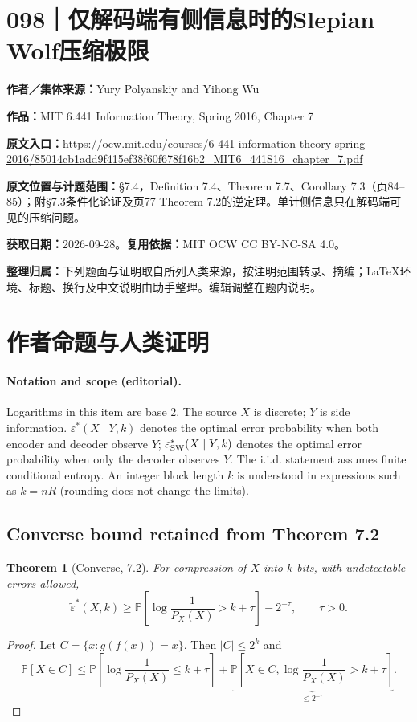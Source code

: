 \documentclass[UTF8,11pt,a4paper]{ctexart}
\newtheorem*{theorem}{Theorem}
\theoremstyle{definition}\newtheorem*{definition}{Definition}
\theoremstyle{remark}\newtheorem*{remark}{Remark}
\newcommand{\Prob}{\mathbb P}
\newcommand{\eps}{\varepsilon}
\begin{document}
\section*{098｜仅解码端有侧信息时的Slepian--Wolf压缩极限}
\textbf{作者／集体来源：}Yury Polyanskiy and Yihong Wu

\textbf{作品：}MIT 6.441 Information Theory, Spring 2016, Chapter 7

\textbf{原文入口：}\url{https://ocw.mit.edu/courses/6-441-information-theory-spring-2016/85014cb1add9f415ef38f60f678f16b2_MIT6_441S16_chapter_7.pdf}

\textbf{原文位置与计题范围：}§7.4，Definition 7.4、Theorem 7.7、Corollary 7.3（页84--85）；附§7.3条件化论证及页77 Theorem 7.2的逆定理。单计侧信息只在解码端可见的压缩问题。

\textbf{获取日期：}2026-09-28。\quad\textbf{复用依据：}MIT OCW CC BY-NC-SA 4.0。

\textbf{整理归属：}下列题面与证明取自所列人类来源，按注明范围转录、摘编；LaTeX环境、标题、换行及中文说明由助手整理。编辑调整在题内说明。

\section*{作者命题与人类证明}

\paragraph{Notation and scope (editorial).}
Logarithms in this item are base $2$. The source $X$ is discrete; $Y$ is side information. $\eps^*(X\mid Y,k)$ denotes the optimal error probability when both encoder and decoder observe $Y$; $\eps^*_{\rm SW}(X\mid Y,k)$ denotes the optimal error probability when only the decoder observes $Y$. The i.i.d. statement assumes finite conditional entropy. An integer block length $k$ is understood in expressions such as $k=nR$ (rounding does not change the limits).

\subsection*{Converse bound retained from Theorem 7.2}
\begin{theorem}[Converse, 7.2]
For compression of $X$ into $k$ bits, with undetectable errors allowed,
\[
\widetilde\eps^*(X,k)\ge
\Prob\left[\log\frac1{P_X(X)}>k+\tau\right]-2^{-\tau},\qquad\tau>0.
\]
\end{theorem}
\begin{proof}
Let $C=\{x:g(f(x))=x\}$. Then $|C|\le2^k$ and
\[
\Prob[X\in C]\le
\Prob\left[\log\frac1{P_X(X)}\le k+\tau\right]
+\underbrace{\Prob\left[X\in C,\log\frac1{P_X(X)}>k+\tau\right]}_{\le2^{-\tau}}.
\]
\end{proof}
\end{document}
